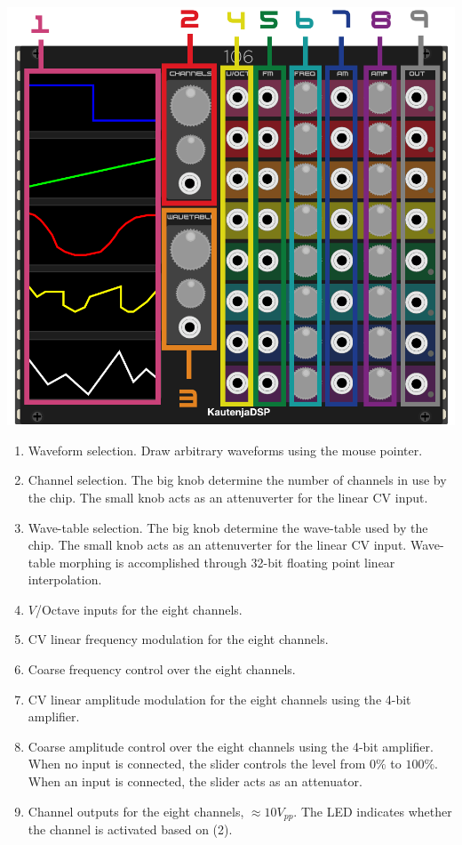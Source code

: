 \documentclass[12pt,a4paper]{article}
\begin{document}
\begin{center}
\includegraphics{106-Manual}
\end{center}

\begin{enumerate}
  \item Waveform selection. Draw arbitrary waveforms using the mouse pointer.
  \item Channel selection. The big knob determine the number of channels in use by the chip. The small knob acts as an attenuverter for the linear CV input.
  \item Wave-table selection. The big knob determine the wave-table used by the chip. The small knob acts as an attenuverter for the linear CV input. Wave-table morphing is accomplished through 32-bit floating point linear interpolation.
  \item $V$/Octave inputs for the eight channels.
  \item CV linear frequency modulation for the eight channels.
  \item Coarse frequency control over the eight channels.
  \item CV linear amplitude modulation for the eight channels using the 4-bit amplifier.
  \item Coarse amplitude control over the eight channels using the 4-bit amplifier. When no input is connected, the slider controls the level from $0\%$ to $100\%$. When an input is connected, the slider acts as an attenuator.
  \item Channel outputs for the eight channels, ${\approx}10V_{pp}$. The LED indicates whether the channel is activated based on (2).
\end{enumerate}


\clearpage
\renewcommand\refname{References \& Acknowledgments}
\nocite{*}


\end{document}
